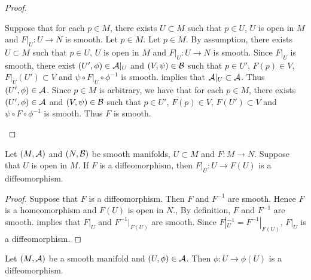 \documentclass{book}
\begin{document}
\begin{proof}
\begin{itemize}
		Suppose that for each $p \in M$, there exists $U \subset M$ such that $p \in U$, $U$ is open in $M$ and $F|_U: U \rightarrow N$ is smooth. Let $p \in M$. Let $p \in M$. By assumption, there exists $U \subset M$ such that $p \in U$, $U$ is open in $M$ and $F|_U: U \rightarrow N$ is smooth. Since $F|_U$ is smooth, there exist $(U', \phi) \in  \mathcal{A}|_U$ and $(V, \psi) \in \mathcal{B}$ such that $p \in U'$, $F(p) \in V$, $F|_U(U') \subset V$ and $\psi \circ F|_U \circ \phi^{-1}$ is smooth.  implies that $\mathcal{A}|_U \subset \mathcal{A}$. Thus $(U', \phi) \in \mathcal{A}$. Since $p \in M$ is arbitrary, we have that for each $p \in M$, there exists $(U', \phi) \in \mathcal{A}$ and $(V, \psi) \in \mathcal{B}$ such that $p \in U'$, $F(p) \in V$, $F(U') \subset V$ and $\psi \circ F \circ \phi^{-1}$ is smooth. Thus $F$ is smooth.   
	\end{itemize}
\end{proof}

\begin{ex} 
	Let $(M, \mathcal{A})$ and $(N, \mathcal{B})$ be smooth manifolds, $U \subset M$ and $F: M \rightarrow N$. Suppose that $U$ is open in $M$. If $F$ is a diffeomorphism, then $F|_U: U \rightarrow F(U)$ is a diffeomorphism.
\end{ex}

\begin{proof}
	Suppose that $F$ is a diffeomorphism. Then $F$ and $F^{-1}$ are smooth. Hence $F$ is a homeomorphism and $F(U)$ is open in $N$., By definition, $F$ and $F^{-1}$ are smooth.  implies that $F|_U$ and $F^{-1}|_{F(U)}$ are smooth. Since $F|_U^{-1} = F^{-1}|_{F(U)}$, $F|_U$ is a diffeomorphism. 
\end{proof}

\begin{ex} 
	Let $(M, \mathcal{A})$ be a smooth manifold and $(U, \phi) \in \mathcal{A}$. Then $\phi:U \rightarrow \phi(U)$ is a diffeomorphism.
\end{ex}
\end{document}
